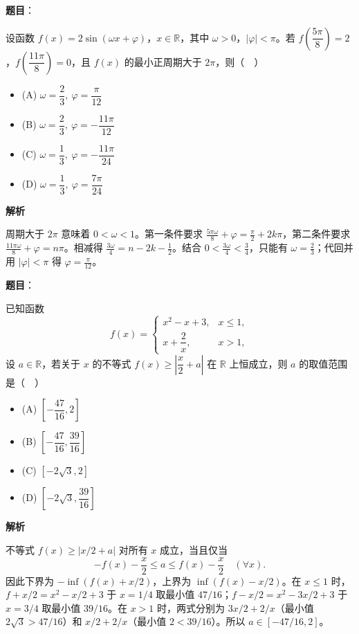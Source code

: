 \begin{answer}

\textbf{题目}：

设函数 $f(x)=2\sin(\omega x+\varphi)$，$x\in\mathbb R$，其中 $\omega>0$，$|\varphi|<\pi$。若 $f\left(\dfrac{5\pi}{8}\right)=2$，$f\left(\dfrac{11\pi}{8}\right)=0$，且 $f(x)$ 的最小正周期大于 $2\pi$，则（　）

\begin{itemize}
\item (A) $\omega=\dfrac23,\ \varphi=\dfrac\pi{12}$
\item (B) $\omega=\dfrac23,\ \varphi=-\dfrac{11\pi}{12}$
\item (C) $\omega=\dfrac13,\ \varphi=-\dfrac{11\pi}{24}$
\item (D) $\omega=\dfrac13,\ \varphi=\dfrac{7\pi}{24}$
\end{itemize}

\textbf{解析}

周期大于 $2\pi$ 意味着 $0<\omega<1$。第一条件要求 $\frac{5\pi\omega}{8}+\varphi=\frac\pi2+2k\pi$，第二条件要求 $\frac{11\pi\omega}{8}+\varphi=n\pi$。相减得 $\frac{3\omega}{4}=n-2k-\frac12$。结合 $0<\frac{3\omega}{4}<\frac34$，只能有 $\omega=\frac23$；代回并用 $|\varphi|<\pi$ 得 $\varphi=\frac\pi{12}$。


\end{answer}
\begin{answer}

\textbf{题目}：

已知函数
\nopagebreak[4]
\[
f(x)=
\begin{cases}
x^2-x+3,&x\leqslant1,\\
x+\dfrac2x,&x>1,
\end{cases}
\]
设 $a\in\mathbb R$，若关于 $x$ 的不等式 $f(x)\geqslant\left|\dfrac x2+a\right|$ 在 $\mathbb R$ 上恒成立，则 $a$ 的取值范围是（　）

\begin{itemize}
\item (A) $\left[-\dfrac{47}{16},2\right]$
\item (B) $\left[-\dfrac{47}{16},\dfrac{39}{16}\right]$
\item (C) $[-2\sqrt3,2]$
\item (D) $\left[-2\sqrt3,\dfrac{39}{16}\right]$
\end{itemize}

\textbf{解析}

不等式 $f(x)\geqslant|x/2+a|$ 对所有 $x$ 成立，当且仅当
\nopagebreak[4]
\[
-f(x)-\frac x2\leqslant a\leqslant f(x)-\frac x2\quad(\forall x).
\]
因此下界为 $-\inf(f(x)+x/2)$，上界为 $\inf(f(x)-x/2)$。在 $x\leqslant1$ 时，$f+x/2=x^2-x/2+3$ 于 $x=1/4$ 取最小值 $47/16$；$f-x/2=x^2-3x/2+3$ 于 $x=3/4$ 取最小值 $39/16$。在 $x>1$ 时，两式分别为 $3x/2+2/x$（最小值 $2\sqrt3>47/16$）和 $x/2+2/x$（最小值 $2<39/16$）。所以 $a\in[-47/16,2]$。


\end{answer}

